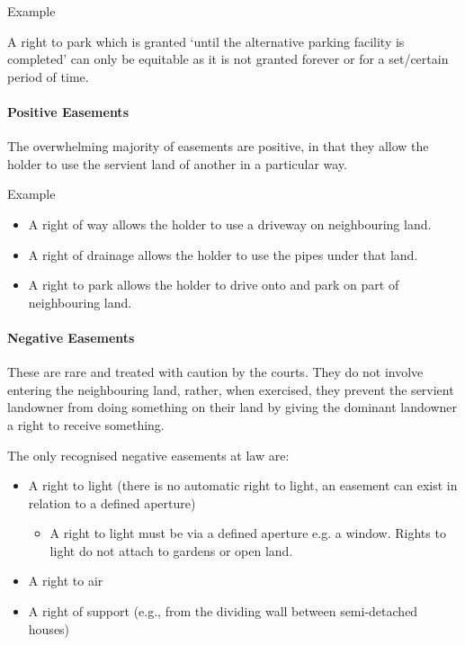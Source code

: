 \documentclass[
]{article}
\providecommand{\tightlist}{%
  \setlength{\itemsep}{0pt}\setlength{\parskip}{0pt}}
\newenvironment{env-de3101d4-f08b-48eb-bc0e-2fa06f3bcf8e}
{
    \savenotes\tcolorbox[blanker,breakable,left=5pt,borderline west={2pt}{-4pt}{purple}]
}
{
    \endtcolorbox\spewnotes
}
\begin{document}
\begin{env-de3101d4-f08b-48eb-bc0e-2fa06f3bcf8e}

Example

A right to park which is granted `until the alternative parking facility
is completed' can only be equitable as it is not granted forever or for
a set/certain period of time.

\end{env-de3101d4-f08b-48eb-bc0e-2fa06f3bcf8e}

\hypertarget{positive-easements}{%
\paragraph{Positive Easements}\label{positive-easements}}

The overwhelming majority of easements are positive, in that they allow
the holder to use the servient land of another in a particular way.

\begin{env-de3101d4-f08b-48eb-bc0e-2fa06f3bcf8e}

Example

\begin{itemize}
\tightlist
\item
  A right of way allows the holder to use a driveway on neighbouring
  land.
\item
  A right of drainage allows the holder to use the pipes under that
  land.
\item
  A right to park allows the holder to drive onto and park on part of
  neighbouring land.
\end{itemize}

\end{env-de3101d4-f08b-48eb-bc0e-2fa06f3bcf8e}

\hypertarget{negative-easements}{%
\paragraph{Negative Easements}\label{negative-easements}}

These are rare and treated with caution by the courts. They do not
involve entering the neighbouring land, rather, when exercised, they
prevent the servient landowner from doing something on their land by
giving the dominant landowner a right to receive something.

The only recognised negative easements at law are:

\begin{itemize}
\tightlist
\item
  A right to light (there is no automatic right to light, an easement
  can exist in relation to a defined aperture)

  \begin{itemize}
  \tightlist
  \item
    A right to light must be via a defined aperture e.g. a window.
    Rights to light do not attach to gardens or open land.
  \end{itemize}
\item
  A right to air
\item
  A right of support (e.g., from the dividing wall between semi-detached
  houses)
\end{itemize}
\end{document}
